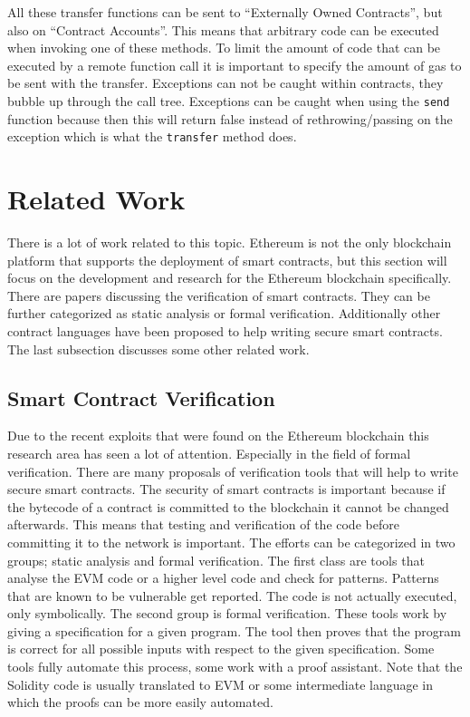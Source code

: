 \documentclass[a4paper]{article}
\begin{document}
All these transfer functions can be sent to ``Externally Owned Contracts'', but also on ``Contract Accounts''. This means that arbitrary code can be executed when invoking one of these methods. To limit the amount of code that can be executed by a remote function call it is important to specify the amount of gas to be sent with the transfer. Exceptions can not be caught within contracts, they bubble up through the call tree. Exceptions can be caught when using the \texttt{send} function because then this will return false instead of rethrowing/passing on the exception which is what the \texttt{transfer} method does.

\newpage
\section{Related Work}
\label{sec:RelatedWork}
There is a lot of work related to this topic. Ethereum is not the only blockchain platform that supports the deployment of smart contracts, but this section will focus on the development and research for the Ethereum blockchain specifically. There are papers discussing the verification of smart contracts. They can be further categorized as static analysis or formal verification. Additionally other contract languages have been proposed to help writing secure smart contracts. The last subsection discusses some other related work.

\subsection{Smart Contract Verification}
Due to the recent exploits that were found on the Ethereum blockchain this research area has seen a lot of attention. Especially in the field of formal verification. There are many proposals of verification tools that will help to write secure smart contracts. The security of smart contracts is important because if the bytecode of a contract is committed to the blockchain it cannot be changed afterwards. This means that testing and verification of the code before committing it to the network is important. The efforts can be categorized in two groups; static analysis and formal verification. The first class are tools that analyse the EVM code or a higher level code and check for patterns. Patterns that are known to be vulnerable get reported. The code is not actually executed, only symbolically. The second group is formal verification. These tools work by giving a specification for a given program. The tool then proves that the program is correct for all possible inputs with respect to the given specification. Some tools fully automate this process, some work with a proof assistant. Note that the Solidity code is usually translated to EVM or some intermediate language in which the proofs can be more easily automated.
\end{document}
